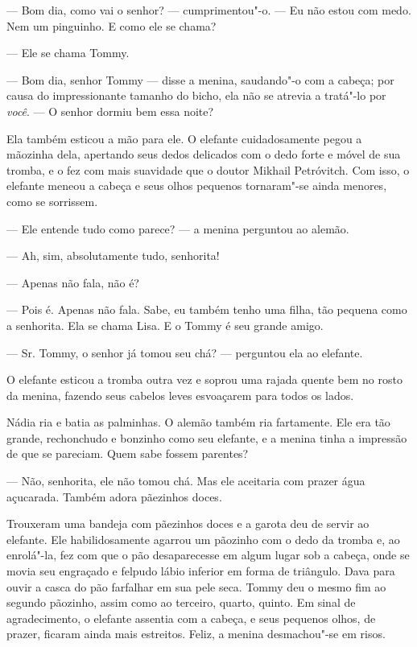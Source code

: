 --- Bom dia, como vai o senhor? --- cumprimentou"-o. --- Eu não estou com
medo. Nem um pinguinho. E como ele se chama?

--- Ele se chama Tommy.

--- Bom dia, senhor Tommy --- disse a menina, sau­dando"-o com a cabeça;
por causa do impressionante tamanho do bicho, ela não se atrevia a
tratá"-lo por \emph{você}. --- O senhor dormiu bem essa noite?

Ela também esticou a mão para ele. O elefante cuidadosamente pegou a
mãozinha dela, apertando seus dedos delicados com o dedo forte e móvel
de sua trom­ba, e o fez com mais suavidade que o doutor Mikhail
Petróvitch. Com isso, o elefante meneou a cabeça e seus olhos pequenos
tornaram"-se ainda menores, como se sorrissem.

--- Ele entende tudo como parece? --- a menina per­guntou ao alemão.

--- Ah, sim, absolutamente tudo, senhorita!

--- Apenas não fala, não é?

--- Pois é. Apenas não fala. Sabe, eu também tenho uma filha, tão
pequena como a senhorita. Ela se cha­ma Lisa. E o Tommy é seu grande
amigo.

--- Sr. Tommy, o senhor já tomou seu chá? --- per­guntou ela ao
elefante.

O elefante esticou a tromba outra vez e soprou uma rajada quente bem no
rosto da menina, fazendo seus cabelos leves esvoaçarem para todos os
lados.

Nádia ria e batia as palminhas. O alemão também ria fartamente. Ele era
tão grande, rechonchudo e bonzinho como seu elefante, e a menina tinha a
impressão de que se pareciam. Quem sabe fossem parentes?

--- Não, senhorita, ele não tomou chá. Mas ele aceitaria com prazer água
açucarada. Também adora pãezinhos doces.

Trouxeram uma bandeja com pãezinhos doces e a garota deu de servir ao
elefante. Ele habilidosamente agarrou um pãozinho com o dedo da tromba
e, ao enro­lá"-la, fez com que o pão desaparecesse em algum lugar sob a
cabeça, onde se movia seu engraçado e felpudo lá­bio inferior em forma
de triângulo. Dava para ouvir a casca do pão farfalhar em sua pele seca.
Tommy deu o mesmo fim ao segundo pãozinho, assim como ao terceiro,
quarto, quinto. Em sinal de agradecimento, o elefante assentia com a
cabeça, e seus pequenos olhos, de prazer, ficaram ainda mais estreitos.
Feliz, a menina desmachou"-se em risos.


